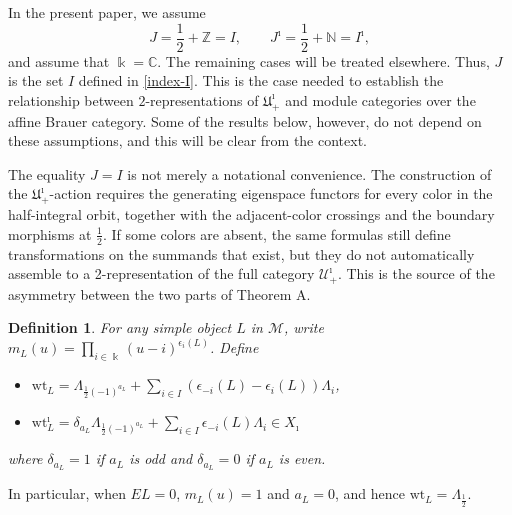 \documentclass[a4,10pt]{amsart}
\numberwithin{equation}{section}
\def\k{\Bbbk}
\newtheorem{Defn}[Theorem]{Definition}
\theoremstyle{definition}
\begin{document}
In the present paper, we  assume 
\[
J=\frac12+\mathbb Z= I,\qquad J^\imath=\frac12+\mathbb N= I^\imath,
\]
and assume that $\Bbbk=\mathbb C$.   The remaining  cases will be treated  elsewhere. 
 Thus, $J$ is the set  $I$ defined  in \eqref{index-I}. 
This is the case needed to establish the
relationship between   $2$-representations of  $\mathfrak U_+^\imath$ and module
categories over the affine Brauer category.  Some of the results below, however, do not depend on these
assumptions, and this will be clear from the context.

The equality $J=I$ is not merely a notational convenience. The construction of the $\mathfrak U^{\imath}_{+}$-action requires the generating eigenspace functors for every color in the half-integral orbit, together with the adjacent-color crossings and the boundary morphisms at $\frac12$. If some colors are absent, the same formulas still define transformations on the summands that exist, but they do not automatically assemble to a 2-representation of the full category $\mathcal U^{\imath}_{+}$. This is the source of the asymmetry between the two parts of Theorem A.



\begin{Defn} \label{expre}   For any simple object $L$ in  $ \mathcal M$,   write
$m_L(u)=\prod_{i\in \k}(u-i)^{\epsilon_i(L)}$.
Define \begin{itemize}\item [(1)]
$\text{wt}_L=
 \Lambda_{\frac{1}{2}(-1)^{a_L}}+ \sum_{i\in I}(\epsilon_{-i}(L)-\epsilon_{i}(L))\Lambda_i$, 
 \item [(2)] 
    $ {\text{wt}}^\imath_L= 
	\delta_{a_L}\Lambda_{\frac{1}{2}(-1)^{a_L}}+ \sum_{i\in I}\epsilon_{-i}(L)\Lambda_i \in X_\imath$
    \end{itemize}   where $\delta_{a_L}=1$ if $a_L$ is  odd and $\delta_{a_L}=0$ if $a_L$ is  even.  
    \end{Defn} 
  In particular, when $EL=0$, $m_L(u)=1$ and $a_L=0$, and hence $\text{wt}_L=\Lambda_{\frac12}$.
 
\end{document}
